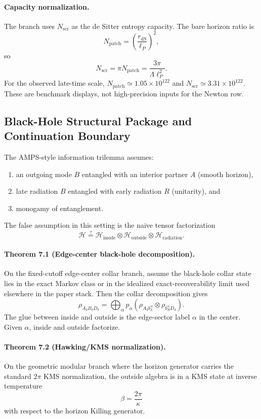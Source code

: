 \paragraph{\textbf{Capacity normalization.}}
The branch uses \(N_{\mathrm{scr}}\) as the de Sitter entropy capacity. The bare horizon ratio is
\[
N_{\mathrm{patch}}=\left(\frac{r_{\mathrm{dS}}}{\ell_P}\right)^2,
\]
so
\[
N_{\mathrm{scr}}=\pi N_{\mathrm{patch}}
=\frac{3\pi}{\Lambda\ell_P^2}.
\]
For the observed late-time scale, \(N_{\mathrm{patch}}\simeq1.05\times10^{122}\) and
\(N_{\mathrm{scr}}\simeq3.31\times10^{122}\).
These are benchmark displays, not high-precision inputs for the Newton row.

\subsection{Black-Hole Structural Package and Continuation Boundary}

The AMPS-style information trilemma assumes:
\begin{enumerate}[leftmargin=2em]
\item an outgoing mode \(B\) entangled with an interior partner \(A\) (smooth horizon),
\item late radiation \(B\) entangled with early radiation \(R\) (unitarity), and
\item monogamy of entanglement.
\end{enumerate}
The false assumption in this setting is the naive tensor factorization
\[
\mathcal H \stackrel{?}{=}
\mathcal H_{\mathrm{inside}}\otimes
\mathcal H_{\mathrm{outside}}\otimes
\mathcal H_{\mathrm{radiation}}.
\]

\paragraph{\textbf{Theorem 7.1 (Edge-center black-hole decomposition).}}
On the fixed-cutoff edge-center collar branch, assume the black-hole collar state lies in the
exact Markov class or in the idealized exact-recoverability limit used elsewhere in the paper
stack. Then the collar decomposition gives
\[
\rho_{A_\delta B_\delta D_\delta}
=
\bigoplus_\alpha p_\alpha
\left(\rho_{A_\delta b_L^\alpha}\otimes \rho_{b_R^\alpha D_\delta}\right).
\]
The glue between inside and outside is the edge-sector label \(\alpha\) in the center.
Given \(\alpha\), inside and outside factorize.

\paragraph{\textbf{Theorem 7.2 (Hawking/KMS normalization).}}
On the geometric modular branch where the horizon generator carries the standard \(2\pi\) KMS
normalization, the outside algebra is in a KMS state at inverse temperature
\[
\beta=\frac{2\pi}{\kappa}
\]
with respect to the horizon Killing generator.

